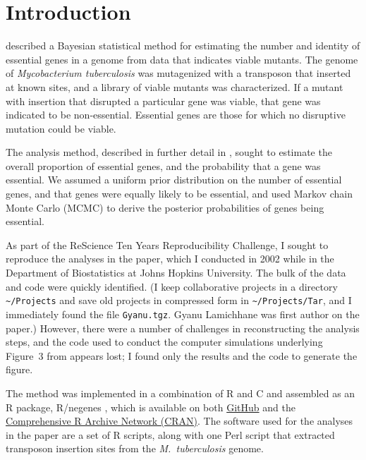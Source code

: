 \setlength{\parskip}{0.5\baselineskip}

\begin{quote}
\small
\articleABSTRACT
\end{quote}


\section{Introduction}

\citet{lamichhane2003} described a Bayesian statistical method for
estimating the number and identity of essential genes in a genome from
data that indicates viable mutants. The genome of \emph{Mycobacterium
tuberculosis\/} was mutagenized with a transposon that inserted at
known sites, and a library of viable mutants was characterized. If a
mutant with insertion that disrupted a particular gene was viable,
that gene was indicated to be non-essential. Essential genes are those
for which no disruptive mutation could be viable.

The analysis method, described in further detail in
\citet{blades2002}, sought to estimate the overall proportion of
essential genes, and the probability that a gene was essential. We
assumed a uniform prior distribution on the number of essential genes,
and that genes were equally likely to be essential, and used Markov
chain Monte Carlo (MCMC) to derive the posterior probabilities of genes being
essential.

As part of the ReScience Ten Years Reproducibility Challenge, I sought
to reproduce the analyses in the paper, which I conducted in 2002
while in the Department of Biostatistics at
Johns Hopkins University. The bulk of the data and code were quickly
identified. (I keep collaborative projects in a directory
{\tt {\textasciitilde}/Projects} and save old projects in compressed form in
{\tt {\textasciitilde}/Projects/Tar}, and I immediately found
the file {\tt Gyanu.tgz}. Gyanu Lamichhane was first author on the
paper.) However, there were a number of challenges in reconstructing
the analysis steps, and the code used to conduct the computer
simulations underlying Figure~3 from \citet{lamichhane2003} appears
lost; I found only the results and the code to generate the figure.

The method was implemented in a combination of R \citep{R} and C
\citep{C} and assembled as an R package, R/negenes \citep{negenes},
which is available on both
\href{https://github.com/kbroman/negenes}{GitHub} and the
\href{https://cran.r-project.org/package=negenes}{Comprehensive R
  Archive Network (CRAN)}. The software used for the analyses in the
paper are a set of R scripts, along with one Perl script
\citep{Perl} that extracted transposon insertion sites from the \emph{M.\
tuberculosis\/} genome.

